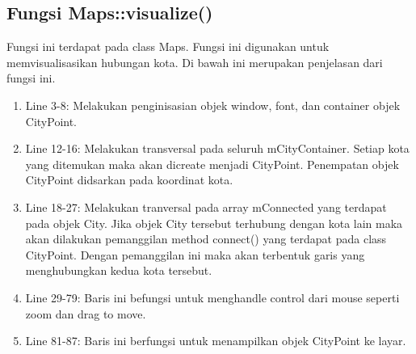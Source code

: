 \documentclass[]{article}
\begin{document}
\subsection{Fungsi Maps::visualize()}
\par
Fungsi ini terdapat pada class Maps. Fungsi ini digunakan untuk memvisualisasikan hubungan kota. Di bawah ini merupakan penjelasan dari fungsi ini.

\begin{enumerate}
    \item Line 3-8: Melakukan penginisasian objek window, font, dan container objek CityPoint.
    \item Line 12-16: Melakukan transversal pada seluruh mCityContainer. Setiap kota yang ditemukan maka akan dicreate menjadi CityPoint. Penempatan objek CityPoint didsarkan pada koordinat kota.
    \item Line 18-27: Melakukan tranversal pada array mConnected yang terdapat pada objek City. Jika objek City tersebut terhubung dengan kota lain maka akan dilakukan pemanggilan method connect() yang terdapat pada class CityPoint. Dengan pemanggilan ini maka akan terbentuk garis yang menghubungkan kedua kota tersebut.
    \item Line 29-79: Baris ini befungsi untuk menghandle control dari mouse seperti zoom dan drag to move.
    \item Line 81-87: Baris ini berfungsi untuk menampilkan objek CityPoint ke layar.
\end{enumerate}
\end{document}
